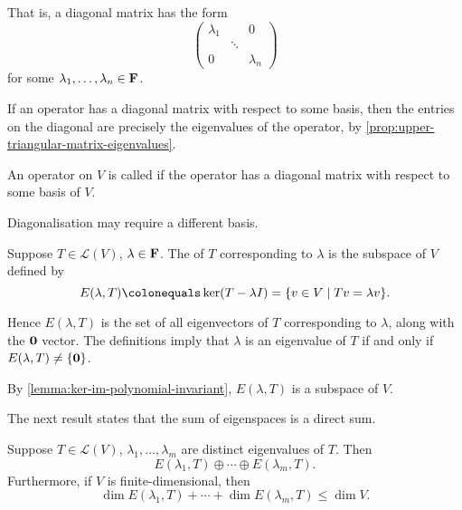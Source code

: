 That is, a diagonal matrix has the form
\[\begin{pmatrix}
\lambda_1&&0\\
&\ddots&\\
0&&\lambda_n
\end{pmatrix}\]
for some $\lambda_1,\dots,\lambda_n\in\mathbf F$.

\begin{remark}
If an operator has a diagonal matrix with respect to some basis, then the entries on the diagonal are precisely the eigenvalues of the operator, by \ref{prop:upper-triangular-matrix-eigenvalues}.
\end{remark}

\begin{definition}[Diagonalisable]
An operator on $V$ is called  if the operator has a diagonal matrix with respect to some basis of $V$.
\end{definition}

\begin{remark}
Diagonalisation may require a different basis.
\end{remark}

\begin{definition}[Eigenspace]
Suppose $T\in\mathcal{L}(V)$, $\lambda\in\mathbf F$. The  of $T$ corresponding to $\lambda$ is the subspace of $V$ defined by
\[E(\lambda,T)\colonequals\ker(T-\lambda I)=\{v\in V\mid Tv=\lambda v\}.\]
\end{definition}

Hence $E(\lambda,T)$ is the set of all eigenvectors of $T$ corresponding to $\lambda$, along with the $\vb{0}$ vector.
The definitions imply that $\lambda$ is an eigenvalue of $T$ if and only if $E(\lambda,T)\neq\{\vb{0}\}$.

By \ref{lemma:ker-im-polynomial-invariant}, $E(\lambda,T)$ is a subspace of $V$. 

The next result states that the sum of eigenspaces is a direct sum.

\begin{proposition}\label{prop:sum-of-eigenspaces-direct-sum}
Suppose $T\in\mathcal{L}(V)$, $\lambda_1,\dots,\lambda_m$ are distinct eigenvalues of $T$. Then
\[E(\lambda_1,T)\oplus\cdots\oplus E(\lambda_m,T).\]
Furthermore, if $V$ is finite-dimensional, then
\[\dim E(\lambda_1,T)+\cdots+\dim E(\lambda_m,T)\le\dim V.\]
\end{proposition}

